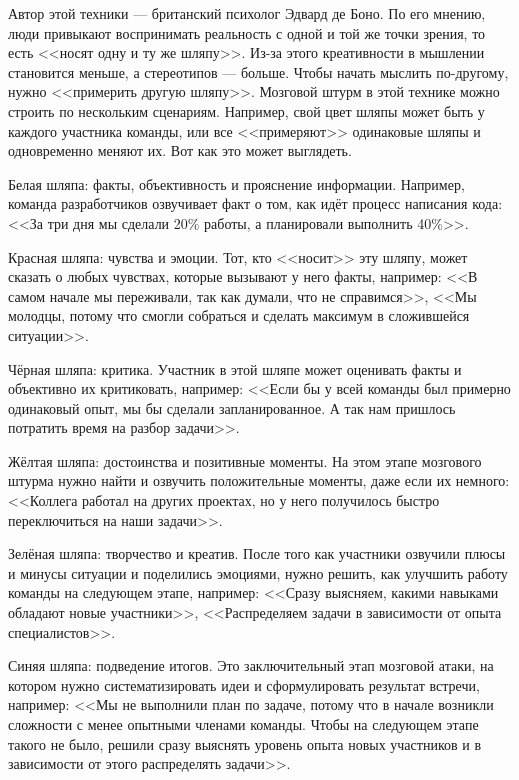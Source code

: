 Автор этой техники — британский психолог Эдвард де Боно. По его мнению, люди привыкают воспринимать реальность с одной и той же точки зрения, то есть <<носят одну и ту же шляпу>>. Из-за этого креативности в мышлении становится меньше, а стереотипов — больше. Чтобы начать мыслить по-другому, нужно <<примерить другую шляпу>>. Мозговой штурм в этой технике можно строить по нескольким сценариям. Например, свой цвет шляпы может быть у каждого участника команды, или все <<примеряют>> одинаковые шляпы и одновременно меняют их. Вот как это может выглядеть.

Белая шляпа: факты, объективность и прояснение информации. Например, команда разработчиков озвучивает факт о том, как идёт процесс написания кода: <<За три дня мы сделали 20\% работы, а планировали выполнить 40\%>>.

Красная шляпа: чувства и эмоции. Тот, кто <<носит>> эту шляпу, может сказать о любых чувствах, которые вызывают у него факты, например: <<В самом начале мы переживали, так как думали, что не справимся>>, <<Мы молодцы, потому что смогли собраться и сделать максимум в сложившейся ситуации>>.

Чёрная шляпа: критика. Участник в этой шляпе может оценивать факты и объективно их критиковать, например: <<Если бы у всей команды был примерно одинаковый опыт, мы бы сделали запланированное. А так нам пришлось потратить время на разбор задачи>>.

Жёлтая шляпа: достоинства и позитивные моменты. На этом этапе мозгового штурма нужно найти и озвучить положительные моменты, даже если их немного: <<Коллега работал на других проектах, но у него получилось быстро переключиться на наши задачи>>.

Зелёная шляпа: творчество и креатив. После того как участники озвучили плюсы и минусы ситуации и поделились эмоциями, нужно решить, как улучшить работу команды на следующем этапе, например: <<Сразу выясняем, какими навыками обладают новые участники>>, <<Распределяем задачи в зависимости от опыта специалистов>>.

Синяя шляпа: подведение итогов. Это заключительный этап мозговой атаки, на котором нужно систематизировать идеи и сформулировать результат встречи, например: <<Мы не выполнили план по задаче, потому что в начале возникли сложности с менее опытными членами команды. Чтобы на следующем этапе такого не было, решили сразу выяснять уровень опыта новых участников и в зависимости от этого распределять задачи>>.
